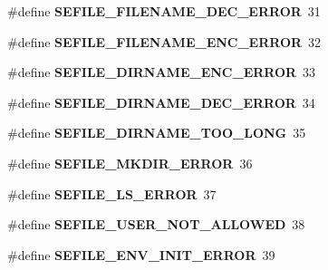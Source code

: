 \begin{DoxyCompactItemize}
\item 
\hypertarget{group__error_values_ga8c68586e02436a25919d5350dd634abf}{\#define {\bfseries S\-E\-F\-I\-L\-E\-\_\-\-F\-I\-L\-E\-N\-A\-M\-E\-\_\-\-D\-E\-C\-\_\-\-E\-R\-R\-O\-R}~31}\label{group__error_values_ga8c68586e02436a25919d5350dd634abf}

\item 
\hypertarget{group__error_values_ga2aa7ba73839f975186cbc5f1326b9e92}{\#define {\bfseries S\-E\-F\-I\-L\-E\-\_\-\-F\-I\-L\-E\-N\-A\-M\-E\-\_\-\-E\-N\-C\-\_\-\-E\-R\-R\-O\-R}~32}\label{group__error_values_ga2aa7ba73839f975186cbc5f1326b9e92}

\item 
\hypertarget{group__error_values_ga31400539e2fa4f94f4ebf80780812e6a}{\#define {\bfseries S\-E\-F\-I\-L\-E\-\_\-\-D\-I\-R\-N\-A\-M\-E\-\_\-\-E\-N\-C\-\_\-\-E\-R\-R\-O\-R}~33}\label{group__error_values_ga31400539e2fa4f94f4ebf80780812e6a}

\item 
\hypertarget{group__error_values_ga38cc6c1072a3f22f11e22d3079c26648}{\#define {\bfseries S\-E\-F\-I\-L\-E\-\_\-\-D\-I\-R\-N\-A\-M\-E\-\_\-\-D\-E\-C\-\_\-\-E\-R\-R\-O\-R}~34}\label{group__error_values_ga38cc6c1072a3f22f11e22d3079c26648}

\item 
\hypertarget{group__error_values_ga3b754ce0aa97840cde8560f172f55968}{\#define {\bfseries S\-E\-F\-I\-L\-E\-\_\-\-D\-I\-R\-N\-A\-M\-E\-\_\-\-T\-O\-O\-\_\-\-L\-O\-N\-G}~35}\label{group__error_values_ga3b754ce0aa97840cde8560f172f55968}

\item 
\hypertarget{group__error_values_ga1839e1718f5b676be3d85b95e6cf58d3}{\#define {\bfseries S\-E\-F\-I\-L\-E\-\_\-\-M\-K\-D\-I\-R\-\_\-\-E\-R\-R\-O\-R}~36}\label{group__error_values_ga1839e1718f5b676be3d85b95e6cf58d3}

\item 
\hypertarget{group__error_values_ga467402454a621261d56af8a938d5cfee}{\#define {\bfseries S\-E\-F\-I\-L\-E\-\_\-\-L\-S\-\_\-\-E\-R\-R\-O\-R}~37}\label{group__error_values_ga467402454a621261d56af8a938d5cfee}

\item 
\hypertarget{group__error_values_ga46a3c08997f9f9f5d81c8647fdeec654}{\#define {\bfseries S\-E\-F\-I\-L\-E\-\_\-\-U\-S\-E\-R\-\_\-\-N\-O\-T\-\_\-\-A\-L\-L\-O\-W\-E\-D}~38}\label{group__error_values_ga46a3c08997f9f9f5d81c8647fdeec654}

\item 
\hypertarget{group__error_values_gad7982cf767e27ebd3ae51b32c7e901fa}{\#define {\bfseries S\-E\-F\-I\-L\-E\-\_\-\-E\-N\-V\-\_\-\-I\-N\-I\-T\-\_\-\-E\-R\-R\-O\-R}~39}\label{group__error_values_gad7982cf767e27ebd3ae51b32c7e901fa}


\end{DoxyCompactItemize}

